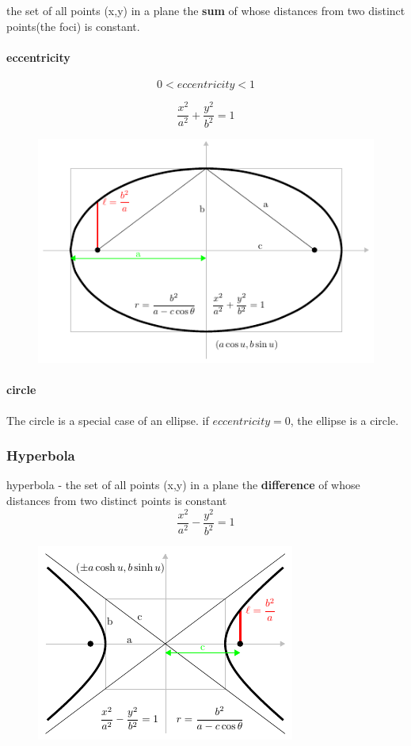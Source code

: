 the set of all points (x,y) in a plane the \textbf{sum} of whose distances from two distinct points(the foci) is constant.

\paragraph*{eccentricity}

$$ 0 < eccentricity < 1 $$

$$ \frac{x^2}{a^2} + \frac{y^2}{b^2} = 1$$


\begin{figure}[h!]
    \begin{center}
        \includegraphics[scale=.45]{./public/images/ellipse2}
    \end{center}
\end{figure}

\paragraph*{circle}

The circle is a special case of an ellipse. if $eccentricity = 0$, the ellipse is a circle.

\subsubsection[hyperbola]{Hyperbola}

hyperbola - the set of all points (x,y) in a plane the \textbf{difference} of whose distances from two distinct points is constant
$$ \frac{x^2}{a^2} - \frac{y^2}{b^2} = 1$$

\begin{figure}[h!]
    \begin{center}
        \includegraphics[scale=.45]{./public/images/hyperbola2}
    \end{center}
\end{figure}